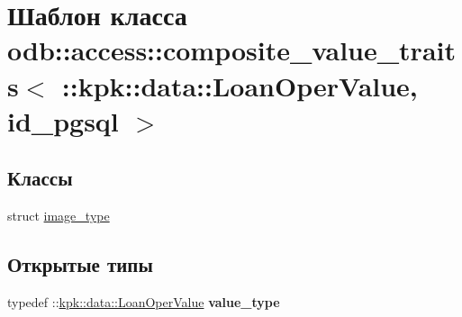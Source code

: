 \hypertarget{classodb_1_1access_1_1composite__value__traits_3_01_1_1kpk_1_1data_1_1_loan_oper_value_00_01id__pgsql_01_4}{}\section{Шаблон класса odb\+:\+:access\+:\+:composite\+\_\+value\+\_\+traits$<$ \+:\+:kpk\+:\+:data\+:\+:Loan\+Oper\+Value, id\+\_\+pgsql $>$}
\label{classodb_1_1access_1_1composite__value__traits_3_01_1_1kpk_1_1data_1_1_loan_oper_value_00_01id__pgsql_01_4}
\subsection*{Классы}
\begin{DoxyCompactItemize}
\item 
struct \hyperlink{structodb_1_1access_1_1composite__value__traits_3_01_1_1kpk_1_1data_1_1_loan_oper_value_00_01id__pgsql_01_4_1_1image__type}{image\+\_\+type}
\end{DoxyCompactItemize}
\subsection*{Открытые типы}
\begin{DoxyCompactItemize}
\item 
typedef \+::\hyperlink{classkpk_1_1data_1_1_loan_oper_value}{kpk\+::data\+::\+Loan\+Oper\+Value} {\bfseries value\+\_\+type}\hypertarget{classodb_1_1access_1_1composite__value__traits_3_01_1_1kpk_1_1data_1_1_loan_oper_value_00_01id__pgsql_01_4_afebce9c3be9334524d052a5308c979b2}{}\label{classodb_1_1access_1_1composite__value__traits_3_01_1_1kpk_1_1data_1_1_loan_oper_value_00_01id__pgsql_01_4_afebce9c3be9334524d052a5308c979b2}

\end{DoxyCompactItemize}
